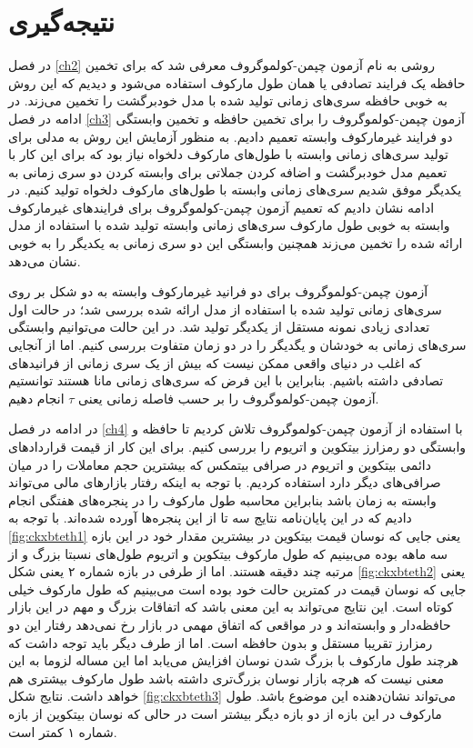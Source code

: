 \chapter{نتیجه‌گیری}
\label{ch5} 

در فصل \ref{ch2} روشی به نام آزمون چپمن-کولموگروف معرفی شد که برای تخمین حافظه یک فرایند تصادفی یا 
همان طول مارکوف استفاده می‌شود و دیدیم که این روش به خوبی حافظه سری‌های زمانی تولید شده با مدل خودبرگشت را تخمین می‌زند. 
در ادامه در فصل \ref{ch3} آزمون چپمن-کولموگروف را برای تخمین حافظه و تخمین وابستگی دو فرایند غیرمارکوف وابسته تعمیم دادیم. 
به منظور آزمایش این روش به مدلی برای تولید سری‌های زمانی وابسته با طول‌های مارکوف دلخواه نیاز بود که برای این کار با تعمیم مدل 
خودبرگشت و اضافه کردن جملاتی برای وابسته کردن دو سری زمانی به یکدیگر موفق شدیم سری‌های زمانی وابسته با طول‌های مارکوف 
دلخواه تولید کنیم. در ادامه نشان دادیم که تعمیم آزمون چپمن-کولموگروف برای فرایندهای غیرمارکوف وابسته به خوبی طول مارکوف سری‌های زمانی 
وابسته تولید شده با استفاده از مدل ارائه شده را تخمین می‌زند همچنین وابستگی این دو سری زمانی به یکدیگر را به خوبی نشان می‌دهد. 

آزمون چپمن-کولموگروف برای دو فرانید غیرمارکوف وابسته به دو شکل بر روی سری‌های زمانی تولید شده با استفاده 
از مدل ارائه شده بررسی شد؛ در حالت اول تعدادی زیادی نمونه مستقل از یکدیگر تولید شد. در این حالت می‌توانیم وابستگی 
سری‌های زمانی به خودشان و یگدیگر را در دو زمان متفاوت بررسی کنیم. اما از آنجایی که اغلب در دنیای واقعی ممکن نیست
 که بیش از یک سری زمانی از فرانیدهای تصادفی داشته باشیم. بنابراین با این فرض که سری‌های زمانی 
  مانا هستند توانستیم آزمون چپمن-کولموگروف را بر حسب فاصله زمانی یعنی $\tau$ انجام دهیم.

 در ادامه در فصل \ref{ch4} با استفاده از آزمون چپمن-کولموگروف تلاش کردیم تا حافظه و وابستگی دو رمزارز بیتکوین و اتریوم را بررسی کنیم. 
 برای این کار از قیمت قراردادهای دائمی بیتکوین و اتریوم در صرافی بیتمکس که بیشترین حجم معاملات را در میان 
 صرافی‌های دیگر دارد استفاده کردیم. با توجه به اینکه رفتار بازارهای مالی می‌تواند وابسته به زمان باشد بنابراین محاسبه طول مارکوف را در 
 پنجره‌های هفتگی انجام دادیم که در این پایان‌نامه نتایج سه تا از این پنجره‌ها آورده شده‌اند. با توجه به \ref{fig:ckxbteth1} یعنی جایی که 
 نوسان قیمت بیتکوین در بیشترین مقدار خود در این بازه سه ماهه بوده می‌بینیم که طول مارکوف بیتکوین و اتریوم طول‌های نسبتا بزرگ و از مرتبه 
 چند دقیقه هستند. اما از طرفی در بازه شماره ۲ یعنی شکل \ref{fig:ckxbteth2} یعنی جایی که نوسان قیمت در کمترین 
 حالت خود بوده است می‌بینیم که طول مارکوف خیلی کوتاه است. 
 این نتایج می‌تواند به این معنی باشد که اتفاقات بزرگ و مهم در این بازار حافظه‌دار و وابسته‌اند و 
 در مواقعی که اتفاق مهمی در بازار رخ نمی‌دهد رفتار این دو رمزارز تقریبا مستقل و بدون حافظه است. اما از طرف دیگر باید توجه 
 داشت که هرچند طول مارکوف با بزرگ شدن نوسان افزایش می‌یابد اما این مساله لزوما به این معنی نیست که هرچه بازار نوسان بزرگ‌تری داشته باشد 
 طول مارکوف بیشتری هم خواهد داشت. نتایج شکل \ref{fig:ckxbteth3} می‌تواند نشان‌دهنده این 
 موضوع باشد. طول مارکوف در این بازه 
 از دو بازه دیگر بیشتر است در حالی که نوسان بیتکوین از بازه شماره ۱ کمتر است. 

